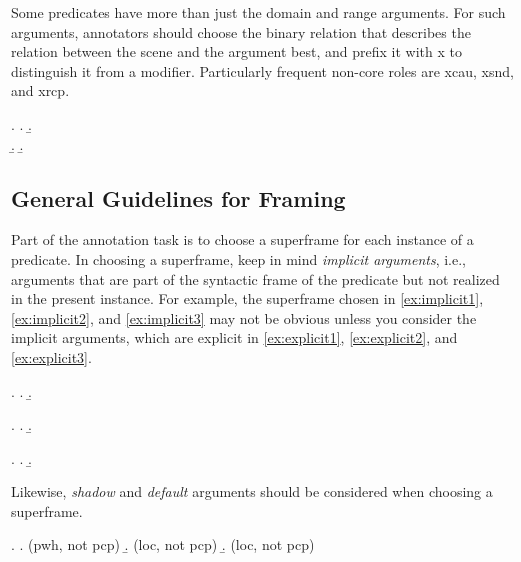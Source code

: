 \documentclass[a4paper]{article}
\begin{document}
Some predicates have more than just the domain and range arguments. For such arguments, annotators should choose the binary relation that describes the relation between the scene and the argument best, and prefix it with \textsf{x} to distinguish it from a modifier. Particularly frequent non-core roles are \textsf{xcau}, \textsf{xsnd}, and \textsf{xrcp}.

\ex. \a. 
     \b. \\
     \b. 
     \b. 


\subsection{General Guidelines for Framing}

Part of the annotation task is to choose a superframe for each instance of a
predicate. In choosing a superframe, keep in mind \emph{implicit arguments},
i.e., arguments that are part of the syntactic frame of the predicate but not
realized in the present instance.  For example, the superframe chosen in
\ref{ex:implicit1}, \ref{ex:implicit2}, and \ref{ex:implicit3} may not be
obvious unless you consider the implicit arguments, which are explicit in
\ref{ex:explicit1}, \ref{ex:explicit2}, and \ref{ex:explicit3}.

\ex.
\a. \label{ex:implicit1}  
\b. \label{ex:explicit1} 

\ex.
\a. \label{ex:implicit2}  
\b. \label{ex:explicit2} 

\ex.
\a. \label{ex:implicit3}  
\b. \label{ex:explicit3} 

Likewise, \emph{shadow} and \emph{default} arguments should be considered when
choosing a superframe.

\ex.
\a.  (\textsf{pwh}, not \textsf{pcp})
\b.  (\textsf{loc}, not \textsf{pcp})
\b.  (\textsf{loc}, not \textsf{pcp})
\end{document}
